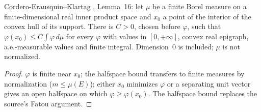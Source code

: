 \begin{lemma}
  \label{lem:cek-point-control}
  \leanok
  Cordero-Erausquin--Klartag \cite{CorderoKlartag2015}, Lemma~16: let $\mu$ be a finite Borel measure on a
  finite-dimensional real inner product space and $x_0$ a point of the interior of the convex hull of its support.  There
  is $C>0$, chosen before $\varphi$, such that $\varphi(x_0)\le C\int\varphi\,d\mu$ for every $\varphi$ with values in
  $[0,+\infty]$, convex real epigraph, a.e.-measurable values and finite integral.  Dimension~$0$ is included; $\mu$ is not
  normalized.
\end{lemma}
\begin{proof}
  \leanok
  $\varphi$ is finite near $x_0$; the halfspace bound transfers to finite measures by normalization ($m\le\mu(E)$); either
  $x_0$ minimizes $\varphi$ or a separating unit vector gives an open halfspace on which $\varphi\ge\varphi(x_0)$.  The
  halfspace bound replaces the source's Fatou argument.
\end{proof}

